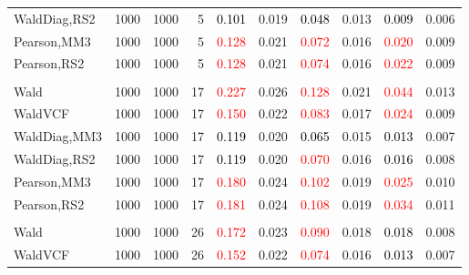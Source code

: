 \documentclass[
]{article}
\begin{document}
\begin{table}[H]
{\begin{tabular}[t]{lrrrrrrlrr}
\hspace{1em}WaldDiag,RS2 & 1000 & 1000 & 5 & \textcolor{black}{0.101} & 0.019 & \textcolor{black}{0.048} & 0.013 & \textcolor{black}{0.009} & 0.006\\
\hspace{1em}Pearson,MM3 & 1000 & 1000 & 5 & \textcolor{red}{0.128} & 0.021 & \textcolor{red}{0.072} & 0.016 & \textcolor{red}{0.020} & 0.009\\
\hspace{1em}Pearson,RS2 & 1000 & 1000 & 5 & \textcolor{red}{0.128} & 0.021 & \textcolor{red}{0.074} & 0.016 & \textcolor{red}{0.022} & 0.009\\
\addlinespace[0.3em]
\multicolumn{10}{l}{\textbf{1F 15V}}\\
\hspace{1em}Wald & 1000 & 1000 & 17 & \textcolor{red}{0.227} & 0.026 & \textcolor{red}{0.128} & 0.021 & \textcolor{red}{0.044} & 0.013\\
\hspace{1em}WaldVCF & 1000 & 1000 & 17 & \textcolor{red}{0.150} & 0.022 & \textcolor{red}{0.083} & 0.017 & \textcolor{red}{0.024} & 0.009\\
\hspace{1em}WaldDiag,MM3 & 1000 & 1000 & 17 & \textcolor{black}{0.119} & 0.020 & \textcolor{black}{0.065} & 0.015 & \textcolor{black}{0.013} & 0.007\\
\hspace{1em}WaldDiag,RS2 & 1000 & 1000 & 17 & \textcolor{black}{0.119} & 0.020 & \textcolor{red}{0.070} & 0.016 & \textcolor{black}{0.016} & 0.008\\
\hspace{1em}Pearson,MM3 & 1000 & 1000 & 17 & \textcolor{red}{0.180} & 0.024 & \textcolor{red}{0.102} & 0.019 & \textcolor{red}{0.025} & 0.010\\
\hspace{1em}Pearson,RS2 & 1000 & 1000 & 17 & \textcolor{red}{0.181} & 0.024 & \textcolor{red}{0.108} & 0.019 & \textcolor{red}{0.034} & 0.011\\
\addlinespace[0.3em]
\multicolumn{10}{l}{\textbf{2F 10V}}\\
\hspace{1em}Wald & 1000 & 1000 & 26 & \textcolor{red}{0.172} & 0.023 & \textcolor{red}{0.090} & 0.018 & \textcolor{black}{0.018} & 0.008\\
\hspace{1em}WaldVCF & 1000 & 1000 & 26 & \textcolor{red}{0.152} & 0.022 & \textcolor{red}{0.074} & 0.016 & \textcolor{black}{0.013} & 0.007\\

\end{tabular}}
\end{table}
\end{document}
